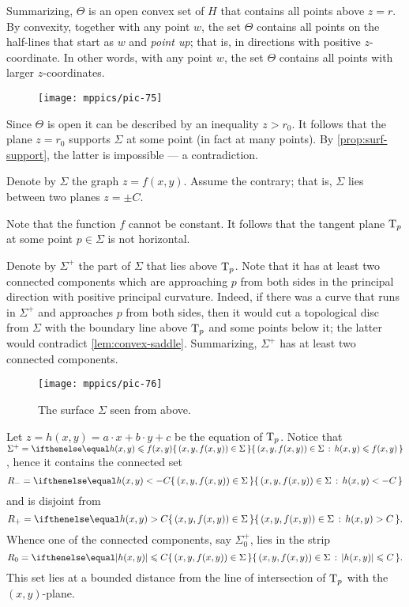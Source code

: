 Summarizing, $\Theta$ is an open convex set of $H$ that contains all points above $z=r$.
By convexity, together with any point $w$, the set $\Theta$ contains all points on the half-lines that start as $w$ and \textit{point up}; that is, in directions with positive $z$-coordinate. 
In other words, with any point $w$,
the set $\Theta$ contains all points with larger $z$-coordinates.
\begin{figure}[!ht]
\vskip-0mm
\centering
\texttt{[image: mppics/pic-75]}
\vskip0mm
\end{figure}
Since $\Theta$ is open it can be described by an inequality $z>r_0$.
It follows that the plane $z=r_0$ supports $\Sigma$ at some point (in fact at many points).
By \ref{prop:surf-support}, the latter is impossible --- a contradiction.
\qeds


Denote by $\Sigma$ the graph $z=f(x,y)$.
Assume the contrary; that is, $\Sigma$ lies between two planes $z=\pm C$.

Note that the function $f$ cannot be constant.
It follows that the tangent plane $\mathrm{T}_p$ at some point $p\in\Sigma$ is not horizontal.

Denote by $\Sigma^+$ the part of $\Sigma$ that lies above $\mathrm{T}_p$.
Note that it has at least two connected components which are approaching $p$ from both sides 
in the principal direction with positive principal curvature.
Indeed, if there was a curve that runs in $\Sigma^+$ and approaches $p$ from both sides, then it would cut a topological disc from $\Sigma$ with the boundary line above $\mathrm{T}_p$ and some points below it;
the latter would contradict \ref{lem:convex-saddle}. 
Summarizing, $\Sigma^+$ has at least two connected components.

\begin{figure}[!ht]
\vskip-0mm
\centering
\texttt{[image: mppics/pic-76]}
\caption*{The surface $\Sigma$ seen from above.}
\vskip0mm
\end{figure}


Let $z=h(x,y)=a\cdot x+b\cdot y+c$ be the equation of $\mathrm{T}_p$.
Notice that $\Sigma^{+} = \set{(x,y,f(x,y))\in \Sigma}{h(x,y) \leq f(x,y)}$, hence it contains the connected set
\[R_-=\set{(x,y,f(x,y))\in\Sigma}{h(x,y)< -C}\] 
and is disjoint from  
\[R_+=\set{(x,y,f(x,y))\in\Sigma}{h(x,y)> C} . \]
Whence one of the connected components, say $\Sigma^+_0$, lies in the strip
\[R_0=\set{(x,y,f(x,y))\in\Sigma}{|h(x,y)|\le  C}.\]
This set lies at a bounded distance from the line of intersection of $\mathrm{T}_p$ with the $(x,y)$-plane.

